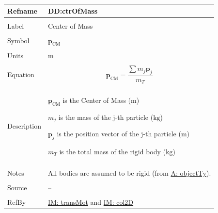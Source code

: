 \documentclass[12pt]{article}
\begin{document}
\vspace{\baselineskip}
\noindent
\begin{minipage}{\textwidth}
\begin{tabular}{>{\raggedright}p{}>{\raggedright\arraybackslash}p{}}
\toprule \textbf{Refname} & \textbf{DD:ctrOfMass}
\label{DD:ctrOfMass}
\\ \midrule \\
Label & Center of Mass
        
\\ \midrule \\
Symbol & ${\mathbf{p}_{\text{CM}}}$
         
\\ \midrule \\
Units & ${\text{m}}$
        
\\ \midrule \\
Equation & \begin{displaymath}
           {\mathbf{p}_{\text{CM}}}=\frac{\displaystyle\sum{{m_{j}} {\mathbf{p}_{j}}}}{{m_{T}}}
           \end{displaymath}
\\ \midrule \\
Description & \begin{symbDescription}
              \item{${\mathbf{p}_{\text{CM}}}$ is the Center of Mass (${\text{m}}$)}
              \item{${m_{j}}$ is the mass of the j-th particle (${\text{kg}}$)}
              \item{${\mathbf{p}_{j}}$ is the position vector of the j-th particle (${\text{m}}$)}
              \item{${m_{T}}$ is the total mass of the rigid body (${\text{kg}}$)}
              \end{symbDescription}
\\ \midrule \\
Notes & All bodies are assumed to be rigid (from \hyperref[assumpOT]{A: objectTy}).
        
\\ \midrule \\
Source & --
         
\\ \midrule \\
RefBy & \hyperref[IM:transMot]{IM: transMot} and \hyperref[IM:col2D]{IM: col2D}
        
\\ \bottomrule
\end{tabular}
\end{minipage}
\end{document}
